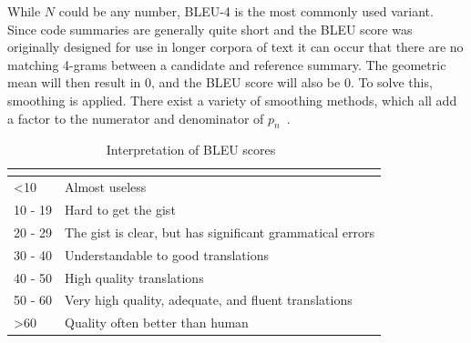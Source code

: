 While \(N\) could be any number, BLEU-4 is the most commonly used variant. Since code summaries are generally quite short and the BLEU score was originally designed for use in longer corpora of text it can occur that there are no matching 4-grams between a candidate and reference summary\cite{evaluationSummarization}. The geometric mean will then result in 0, and the BLEU score will also be 0. To solve this, smoothing is applied. There exist a variety of smoothing methods, which all add a factor to the numerator and denominator of \(p_n\)~\cite{evaluationSummarization}.

\begin{table}[tbh]
\begin{tabular}{l|l}
\hline
\rowcolor[HTML]{E8EAED} 
\multicolumn{1}{|l|}{\cellcolor[HTML]{E8EAED}{\color[HTML]{202124} \textbf{BLEU Score}}} & \multicolumn{1}{l|}{\cellcolor[HTML]{E8EAED}{\color[HTML]{202124} Interpretation}} \\ \hline
\rowcolor[HTML]{FFFFFF} 
{\color[HTML]{202124} \textless 10}                                                      & {\color[HTML]{202124} Almost useless}                                              \\
\rowcolor[HTML]{FFFFFF} 
{\color[HTML]{202124} 10 - 19}                                                           & {\color[HTML]{202124} Hard to get the gist}                                        \\
\rowcolor[HTML]{FFFFFF} 
{\color[HTML]{202124} 20 - 29}                                                           & {\color[HTML]{202124} The gist is clear, but has significant grammatical errors}   \\
\rowcolor[HTML]{FFFFFF} 
{\color[HTML]{202124} 30 - 40}                                                           & {\color[HTML]{202124} Understandable to good translations}                         \\
\rowcolor[HTML]{FFFFFF} 
{\color[HTML]{202124} 40 - 50}                                                           & {\color[HTML]{202124} High quality translations}                                   \\
\rowcolor[HTML]{FFFFFF} 
{\color[HTML]{202124} 50 - 60}                                                           & {\color[HTML]{202124} Very high quality, adequate, and fluent translations}        \\
\rowcolor[HTML]{FFFFFF} 
{\color[HTML]{202124} \textgreater 60}                                                   & {\color[HTML]{202124} Quality often better than human}
\end{tabular}
\caption{Interpretation of BLEU scores~\cite{evaluationSummarization}}
\label{tab:BLEUScale}
\end{table}

